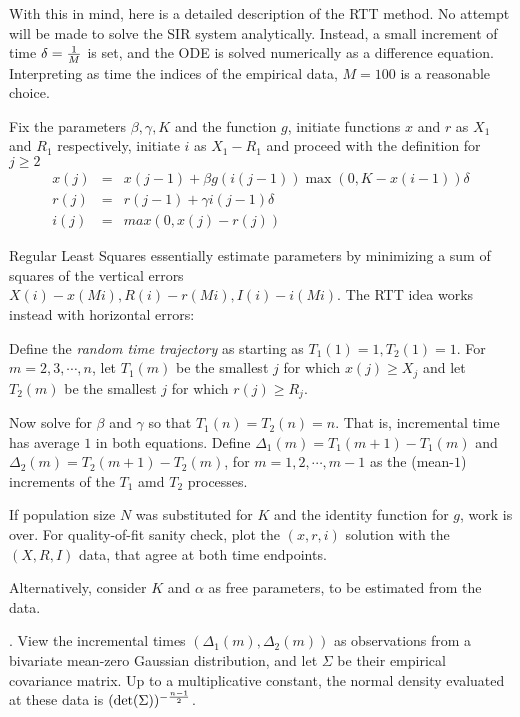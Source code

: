 \documentclass{article}
\begin{document}
{\bigskip

With this in mind, here is a detailed description of the RTT method. No attempt will be made to solve the SIR system analytically. Instead, a small increment of time $\delta={1 \over M}$ is set, and the ODE is solved numerically as a difference equation. Interpreting as time the indices of the empirical data, $M=100$ is a reasonable choice.

Fix the parameters $\beta, \gamma, K$ and the function $g$, initiate functions $x$ and $r$ as $X_1$ and $R_1$ respectively, initiate $i$ as $X_1-R_1$ and proceed with the definition for $j \ge 2$
\begin{eqnarray}
x(j)&=&x(j-1)+\beta g(i(j-1))\max(0,K-x(i-1)) \delta \nonumber \\
r(j)&=&r(j-1)+\gamma i(j-1) \delta \nonumber \\
i(j)&=&max(0,x(j)-r(j)) \label{thesolution}
\end{eqnarray}

Regular Least Squares essentially estimate parameters by minimizing a sum of squares of the vertical errors $X(i)-x(M i), R(i)-r(M i), I(i)-i(M i)$. The RTT idea works instead with horizontal errors:

\bigskip

Define the {\em random time trajectory} as starting as $T_1(1)=1, T_2(1)=1$. For $m=2,3,\cdots,n$, let $T_1(m)$ be the smallest $j$ for which $x(j) \ge X_j$ and let $T_2(m)$ be the smallest $j$ for which $r(j) \ge R_j$.

Now solve for $\beta$ and $\gamma$ so that $T_1(n)=T_2(n)=n$. That is, incremental time has average $1$ in both equations. Define $\Delta_1(m)=T_1(m+1)-T_1(m)$ and $\Delta_2(m)=T_2(m+1)-T_2(m)$, for $m=1, 2, \cdots,m-1$ as the (mean-$1$) increments of the $T_1$ amd $T_2$ processes.

\bigskip

If population size $N$ was substituted for $K$ and the identity function for $g$, work is over. For quality-of-fit sanity check, plot the $(x,r,i)$ solution with the $(X,R,I)$ data, that agree at both time endpoints.

Alternatively, consider $K$ and $\alpha$ as free parameters, to be estimated from the data. 

\bigskip

. View the incremental times \linebreak $(\Delta_1(m),\Delta_2(m))$ as observations from a bivariate mean-zero Gaussian distribution, and let $\Sigma$ be their empirical covariance matrix. Up to a multiplicative constant, the normal density evaluated at these data is $(\det(\Sigma))^{-{{n-1} \over 2}}$.

}
\end{document}
